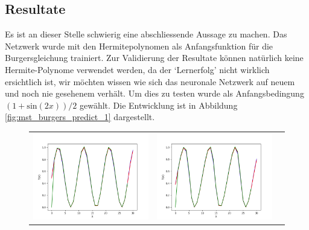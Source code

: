 \subsection{Resultate}

Es ist an dieser Stelle schwierig eine abschliessende Aussage zu
machen. Das Netzwerk wurde mit den Hermitepolynomen als Anfangsfunktion
für die Burgersgleichung trainiert. Zur Validierung der Resultate
können natürlich keine Hermite-Polynome verwendet werden, da der
`Lernerfolg' nicht wirklich ersichtlich ist, wir möchten wissen wie
sich das neuronale Netzwerk auf neuem und noch nie gesehenem verhält.
Um dies zu testen wurde als Anfangsbedingung $(1 + \text{sin}(2x))
/ 2$ gewählt. Die Entwicklung ist in Abbildung
\ref{fig:mst_burgers_predict_1} dargestellt.

\begin{figure}
	\centering
	\begin{tabular}{ccc}
		\includegraphics[scale=0.27]{learning/img/burger_predict0.png} &
		\includegraphics[scale=0.27]{learning/img/burger_predict10.png} &

\end{tabular}
\end{figure}
